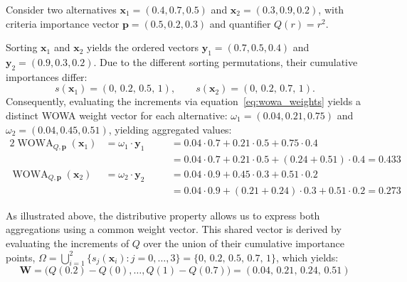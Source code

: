 \begin{example}
Consider two alternatives $\mathbf{x}_1=(0.4,0.7,0.5)$ and $\mathbf{x}_2=(0.3,0.9,0.2)$, with criteria importance vector $\mathbf{p}=(0.5,0.2,0.3)$ and quantifier $Q(r)=r^2$.

Sorting $\mathbf{x}_1$ and $\mathbf{x}_2$ yields the ordered vectors $\mathbf{y}_1=(0.7,0.5,0.4)$ and $\mathbf{y}_2=(0.9,0.3,0.2)$. Due to the different sorting permutations, their cumulative importances differ:
\[
s(\mathbf{x}_1) = (0,\, 0.2,\, 0.5,\, 1), \qquad s(\mathbf{x}_2) = (0,\, 0.2,\, 0.7,\, 1).
\]
Consequently, evaluating the increments via equation~\ref{eq:wowa_weights} yields a distinct WOWA weight vector for each alternative: $\omega_1 = (0.04, 0.21, 0.75)$ and $\omega_2 = (0.04, 0.45, 0.51)$, yielding aggregated values:
\begin{alignat*}{2}
\operatorname{WOWA}_{Q,\mathbf{p}}(\mathbf{x}_1) & = \omega_1 \cdot \mathbf{y}_1
		&\quad & = 0.04 \cdot 0.7 + 0.21 \cdot 0.5 + 0.75 \cdot 0.4 \\
		&
		&\quad & = 0.04 \cdot 0.7 + 0.21 \cdot 0.5 + (0.24 + 0.51) \cdot 0.4 = 0.433 \\[0.5em]
\operatorname{WOWA}_{Q,\mathbf{p}}(\mathbf{x}_2) & = \omega_2 \cdot \mathbf{y}_2
		&\quad & = 0.04 \cdot 0.9 + 0.45 \cdot 0.3 + 0.51 \cdot 0.2 \\
		&
		&\quad & = 0.04 \cdot 0.9 + (0.21 + 0.24) \cdot 0.3 + 0.51 \cdot 0.2 = 0.273
\end{alignat*}

As illustrated above, the distributive property allows us to express both aggregations using a common weight vector. This shared vector is derived by evaluating the increments of $Q$ over the union of their cumulative importance points, $\Omega = \bigcup_{i=1}^{2}\{s_j(\mathbf{x}_i):j=0,\dots,3\} = \{0,\, 0.2,\, 0.5,\, 0.7,\, 1\}$, which yields:
\[
\mathbf{W} = \bigl(Q(0.2)-Q(0), \dots, Q(1)-Q(0.7)\bigr) = (0.04,\, 0.21,\, 0.24,\, 0.51)
\]


\end{example}
